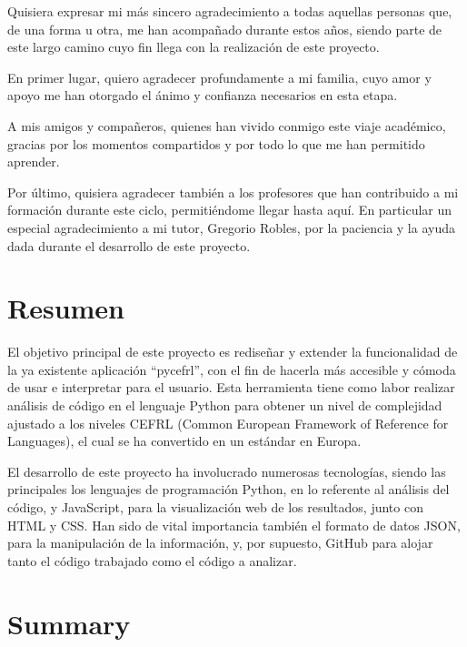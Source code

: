 \documentclass[a4paper, 12pt]{book}
\begin{document}
Quisiera expresar mi más sincero agradecimiento a todas aquellas personas que, de una forma u otra, me han acompañado durante estos años, siendo parte de este largo camino cuyo fin llega con la realización de este proyecto.

En primer lugar, quiero agradecer profundamente a mi familia, cuyo amor y apoyo me han otorgado el ánimo y confianza necesarios en esta etapa.

A mis amigos y compañeros, quienes han vivido conmigo este viaje académico, gracias por los momentos compartidos y por todo lo que me han permitido aprender.

Por último, quisiera agradecer también a los profesores que han contribuido a mi formación durante este ciclo, permitiéndome llegar hasta aquí. En particular un especial agradecimiento a mi tutor, Gregorio Robles, por la paciencia y la ayuda dada durante el desarrollo de este proyecto.

\chapter*{Resumen}

El objetivo principal de este proyecto es rediseñar y extender la funcionalidad de la ya existente aplicación ``pycefrl'', con el fin de hacerla más accesible y cómoda de usar e interpretar para el usuario. Esta herramienta tiene como labor realizar análisis de código en el lenguaje Python para obtener un nivel de complejidad ajustado a los niveles CEFRL (Common European Framework of Reference for Languages), el cual se ha convertido en un estándar en Europa.

El desarrollo de este proyecto ha involucrado numerosas tecnologías, siendo las principales los lenguajes de programación Python, en lo referente al análisis del código, y JavaScript, para la visualización web de los resultados, junto con HTML y CSS. Han sido de vital importancia también el formato de datos JSON, para la manipulación de la información, y, por supuesto, GitHub para alojar tanto el código trabajado como el código a analizar.


\chapter*{Summary}
\end{document}
